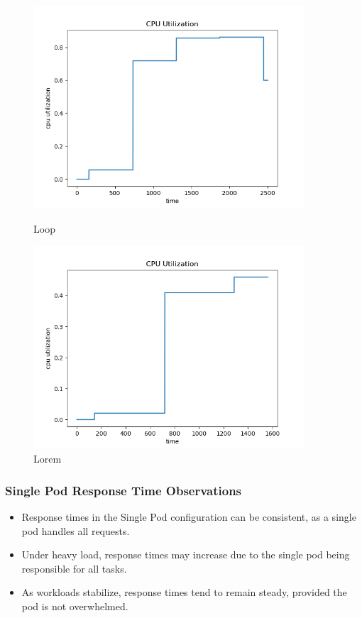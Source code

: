 \begin{figure}[h]
    \begin{minipage}[t]{0.5\textwidth}
        \centering
        \includegraphics[width=0.9\textwidth]{../sample_results/loop/single-pod/cpu-utilization-single-pod.png}
        \caption{Loop}
    \end{minipage}
    \hfill
    \begin{minipage}[t]{0.5\textwidth}
        \centering
        \includegraphics[width=0.9\textwidth]{../sample_results/lorem/single-pod/cpu-utilization-single-pod.png}
        \caption{Lorem}
    \end{minipage}
\end{figure}

\newpage
\subsubsection{Single Pod Response Time Observations}
\begin{itemize}
    \item Response times in the Single Pod configuration can be consistent, as a single pod handles all requests.
    \item Under heavy load, response times may increase due to the single pod being responsible for all tasks.
    \item As workloads stabilize, response times tend to remain steady, provided the pod is not overwhelmed.
\end{itemize}

